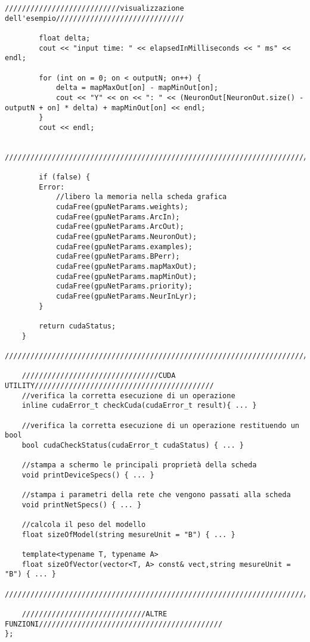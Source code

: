 \documentclass[10pt,a4paper]{article}
\begin{document}
\begin{lstlisting}[style=mycuda, caption=librerie usate, captionpos=b]
		///////////////////////////visualizzazione dell'esempio//////////////////////////////

		float delta;
		cout << "input time: " << elapsedInMilliseconds << " ms" << endl;

		for (int on = 0; on < outputN; on++) {
			delta = mapMaxOut[on] - mapMinOut[on];
			cout << "Y" << on << ": " << (NeuronOut[NeuronOut.size() - outputN + on] * delta) + mapMinOut[on] << endl;
		}
		cout << endl;
		
		//////////////////////////////////////////////////////////////////////////////////////

		if (false) {
		Error:
			//libero la memoria nella scheda grafica
			cudaFree(gpuNetParams.weights);
			cudaFree(gpuNetParams.ArcIn);
			cudaFree(gpuNetParams.ArcOut);
			cudaFree(gpuNetParams.NeuronOut);
			cudaFree(gpuNetParams.examples);
			cudaFree(gpuNetParams.BPerr);
			cudaFree(gpuNetParams.mapMaxOut);
			cudaFree(gpuNetParams.mapMinOut);
			cudaFree(gpuNetParams.priority);
			cudaFree(gpuNetParams.NeurInLyr);
		}

		return cudaStatus;
	}
	//////////////////////////////////////////////////////////////////////////////////////
	
	////////////////////////////////CUDA UTILITY//////////////////////////////////////////
	//verifica la corretta esecuzione di un operazione
	inline cudaError_t checkCuda(cudaError_t result){ ... }
	
	//verifica la corretta esecuzione di un operazione restituendo un bool
	bool cudaCheckStatus(cudaError_t cudaStatus) { ... }
	
	//stampa a schermo le principali proprietà della scheda
	void printDeviceSpecs() { ... }
	
	//stampa i parametri della rete che vengono passati alla scheda
	void printNetSpecs() { ... }
	
	//calcola il peso del modello
	float sizeOfModel(string mesureUnit = "B") { ... }
	
	template<typename T, typename A>
	float sizeOfVector(vector<T, A> const& vect,string mesureUnit = "B") { ... }
	//////////////////////////////////////////////////////////////////////////////////////
	
	/////////////////////////////ALTRE FUNZIONI///////////////////////////////////////////
};

\end{lstlisting}
\end{document}
